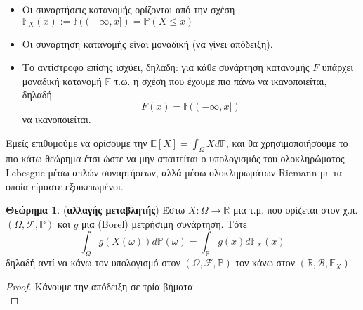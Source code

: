 \documentclass[12pt,a4paper]{article}
\theoremstyle{definition}
\numberwithin{equation}{section}
\newtheorem{theorima}{Θεώρημα}
\begin{document}
{\begin{itemize}
\item Οι συναρτήσεις κατανομής ορίζονται από την σχέση \(\mathbb{F}_X(x) := \mathbb{F}((-\infty,x]) = \mathbb{P}(X\leq x)\)
\item Οι συνάρτηση κατανομής είναι μοναδική (να γίνει απόδειξη).
\item Το αντίστροφο επίσης ισχύει, δηλαδη: για κάθε συνάρτηση κατανομής \(F\) υπάρχει μοναδική κατανομή \(\mathbb{F}\) τ.ω. η σχέση που έχουμε πιο πάνω να ικανοποιείται, δηλαδή
$$F(x) = \mathbb{F}((-\infty,x])$$
να ικανοποιείται.
\end{itemize}


Εμείς επιθυμούμε να ορίσουμε την \(\mathbb{E}[X] = \int_\Omega X d\mathbb{P}\), και θα χρησιμοποιήσουμε το πιο κάτω θεώρημα έτσι ώστε να μην απαιτείται
ο υπολογισμός του ολοκληρώματος \textlatin{Lebesgue} μέσω απλών συναρτήσεων, αλλά μέσω ολοκληρωμάτων \textlatin{Riemann} με τα οποία είμαστε εξοικειωμένοι.

  \begin{theorima}(\textbf{αλλαγής μεταβλητής}) Έστω $X:\Omega \rightarrow \mathbb{R}$ μια τ.μ. που ορίζεται στον χ.π. $(\Omega,\mathcal{F},\mathbb{P})$ και $g$ μια (Borel) μετρήσιμη συνάρτηση.
    Τότε
$$ \int_\Omega g(X(\omega)) d\mathbb{P}(\omega) = \int_\mathbb{R} g(x)d\mathbb{F}_X(x)$$
δηλαδή αντί να κάνω τον υπολογισμό στον $(\Omega, \mathcal{F}, \mathbb{P})$ τον κάνω στον $(\mathbb{R},\mathcal{B},\mathbb{F}_X)$
  \end{theorima}

\begin{proof} Κάνουμε την απόδειξη σε τρία βήματα.\\


\end{proof}}
\end{document}
